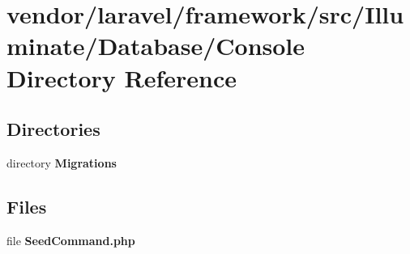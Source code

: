\section{vendor/laravel/framework/src/\+Illuminate/\+Database/\+Console Directory Reference}
\label{dir_7f1f94476a010c6049c047fc0acac29d}
\subsection*{Directories}
\begin{DoxyCompactItemize}
\item 
directory {\bf Migrations}
\end{DoxyCompactItemize}
\subsection*{Files}
\begin{DoxyCompactItemize}
\item 
file {\bf Seed\+Command.\+php}
\end{DoxyCompactItemize}
